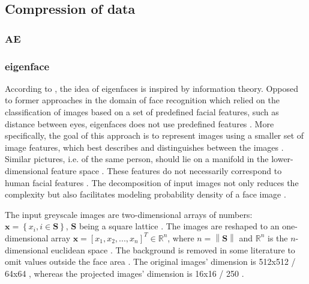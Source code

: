 \subsection{Compression of data}\label{subsec:compression}
\subsubsection{AE}\label{subsec:autoencoder}

\subsubsection{eigenface}\label{subsec:eigenface}

According to \citeauthor{eigenfaces1991}, the idea of eigenfaces is inspired by information theory.
Opposed to former approaches in the domain of face recognition which relied on the classification of images based on a set of predefined facial features, such as distance between eyes,
eigenfaces does not use predefined features \cite{eigenfaces1991}.
More specifically, the goal of this approach is to represent images using a smaller set of image features, which best describes and distinguishes between the images \cite{eigenfaces1991, eigenfaces2013}.
Similar pictures, i.e. of the same person, should lie on a manifold in the lower-dimensional feature space \cite{face-recognition2008}.
These features do not necessarily correspond to human facial features \cite{eigenfaces1991}.
The decomposition of input images not only reduces the complexity but also facilitates modeling probability density of a face image \cite{face-recognition2008}.

The input greyscale images are two-dimensional arrays of numbers: $\textbf{x} = \left\{ x_i, i \in \textbf{S} \right\}$, $\textbf{S}$ being a square lattice \cite{eigenfaces1997, eigenfaces1991}.
The images are reshaped to an one-dimensional array $\textbf{x} = \left[x_1, x_2, ..., x_n  \right]^{T} \in \mathbb{R}^{n}$, 
where $n = \left\| \textbf{S} \right\|$ and $\mathbb{R}^{n}$ is the $n$-dimensional euclidean space \cite{eigenfaces1997}.
The background is removed in some literature to omit values outside the face area \cite{eigenfaces1991}.
The original images' dimension is 512x512 \cite{eigenfaces1991}/ 64x64 \cite{face-recognition2020}, whereas the projected images' dimension is 16x16 \cite{eigenfaces1991}/ 250 \cite{face-recognition2020}.

